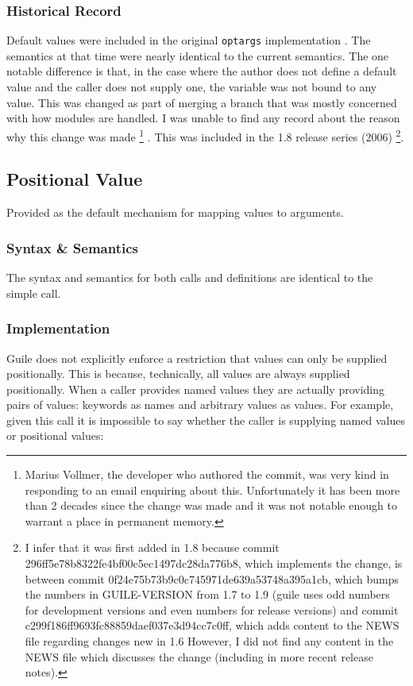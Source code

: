 \subsubsection{Historical Record}
Default values were included in the original \texttt{optargs} implementation
\parencite[][NEWS lines 11451-11525]{guile-source}. 
The semantics at that time were nearly identical to the current semantics.
The one notable difference is that, in the case where the author does not define a
default value and the caller does not supply one, the variable was not bound to any value.
This was changed as part of merging a branch that was mostly concerned with how modules
are handled.
I was unable to find any record about the reason why this change was made
\footnote{
	Marius Vollmer, the developer who authored the commit, was very kind in responding to an
	email enquiring about this.
	Unfortunately it has been more than 2 decades since the change was made and it was not
	notable enough to warrant a place in permanent memory.
}
\parencite[][commit 296ff5e78b8322fe4bf00c5ec1497dc28da776b8]{guile-source}
\parencite[][2001-05 lines 11305-11313]{guile-devel-archive}.
This was included in the 1.8 release series (2006)
\parencite[][Section 9.1.4 "A Timeline of Selected Guile Releases"]{guile-manual}
\footnote{
	I infer that it was first added in 1.8 because commit
	296ff5e78b8322fe4bf00c5ec1497dc28da776b8, which implements the change, is between
	commit 0f24e75b73b9c0c745971de639a53748a395a1cb, which bumps the numbers in
	GUILE-VERSION from 1.7 to 1.9 (guile uses odd numbers for development versions and even
	numbers for release versions) and commit c299f186ff9693fc88859daef037e3d94cc7c0ff, which
	adds content to the NEWS file regarding changes new in 1.6
	However, I did not find any content in the NEWS file which discusses the change
	(including in more recent release notes).
}.

\subsection{Positional Value}
Provided as the default mechanism for mapping values to arguments.

\subsubsection{Syntax \& Semantics}
The syntax and semantics for both calls and definitions are identical to the simple call.

\subsubsection{Implementation}
Guile does not explicitly enforce a restriction that values can only be supplied
positionally.
This is because, technically, all values are always supplied positionally.
When a caller provides named values they are actually providing pairs of values: keywords
as names and arbitrary values as values.
For example, given this call it is impossible to say whether the caller is supplying
named values or positional values:

